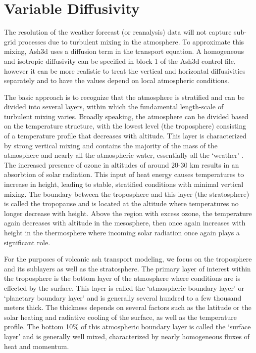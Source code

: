 \chapter{Variable Diffusivity}\label{ChapAppendVarDiff}
The resolution of the weather forecast (or reanalysis) data will not capture sub-grid
processes due to turbulent mixing in the atmosphere. To approximate this mixing, Ash3d
uses a diffusion term in the transport equation. A homogeneous and isotropic diffusivity
can be specified in block 1 of the Ash3d control file, however it can be more realistic to 
treat the vertical and horizontal diffusivities separately and to have the values
depend on local atmospheric conditions.

The basic approach is to recognize that the atmosphere is stratified and can be divided into
several layers, within which the fundamental length-scale of turbulent mixing varies.
Broadly speaking, the atmosphere can be divided based on the temperature structure,
with the lowest level (the troposphere) consisting of a temperature profile that
decreases with altitude. This layer is characterized by strong vertical mixing and
contains the majority of the mass of the atmosphere and nearly all the atmospheric
water, essentially all the `weather' \cite{WallaceHobbs1977}.
The increased presence of ozone in altitudes of around 20-30 km results in an
absorbtion of solar radiation. This input of heat energy causes temperatures to
increase in height, leading to stable, stratified conditions with minimal vertical
mixing. The boundary between the troposphere and this layer (the stratosphere) is called
the tropopause and is located at the altitude where temperatures no longer decrease with
height.
Above the region with excess ozone, the temperature again decreases with
altitude in the mesosphere, then once again increases with height in the thermosphere
where incoming solar radiation once again plays a significant role.

For the purposes of volcanic ash transport modeling, we focus on the troposphere and
its sublayers as well as the stratosphere.
The primary layer of interest within the troposphere is the bottom layer
of the atmosphere where conditions are 
is effected by the surface. This layer is called the `atmospheric boundary layer' or
`planetary boundary layer' and is generally several hundred to a few thousand meters thick.
The thickness depends on several factors such as the latitude or the solar heating and
radiative cooling of the surface, as well as the temperature profile.
The bottom 10\% of this atmospheric boundary layer is called the `surface layer' and 
is generally well mixed, characterized by nearly homogeneous fluxes of heat and momentum.

